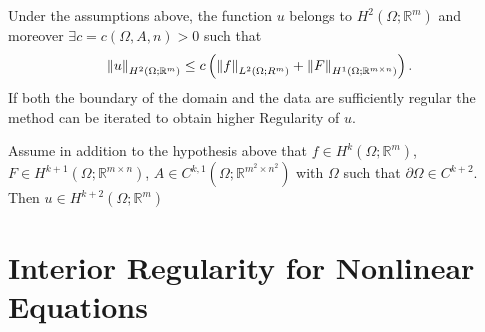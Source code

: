 \begin{thm}
	Under the assumptions above, the function \( u \) belongs to \( H^{2}(\Omega ; \mathbb{R}^{m})  \) and moreover \( \exists c = c(\Omega , A, n) > 0 \) such that
	\begin{gather}
		\norm{u}_{H^{2}(\Omega ; \mathbb{R}^{m}) } \leq  c \left( \norm{f}_{L^{2}(\Omega ; R^{m})} + \norm{F}_{H^{1}(\Omega ; \mathbb{R}^{m \times n}) } \right).
	\end{gather}
	If both the boundary of the domain and the data are sufficiently regular the method can be iterated to obtain higher Regularity of \( u \).
\end{thm}

\begin{thm}[]
	Assume in addition to the hypothesis above that \( f \in  H^{k}(\Omega ; \mathbb{R}^{m})  \), \( F \in  H^{k+1}(\Omega ; \mathbb{R}^{m \times n})  \), \( A \in C^{k,1}(\Omega ; \mathbb{R}^{m^{2}\times n^{2}})  \) with \( \Omega  \) such that \( \partial \Omega \in C^{k+2} \). Then \( u \in H^{k+2}(\Omega ; \mathbb{R}^{m})  \)
\end{thm}

\section{Interior Regularity for Nonlinear Equations}

